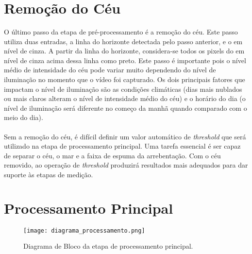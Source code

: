 \section{Remoção do Céu}
\paragraph{}O último passo da etapa de pré-processamento é a remoção do céu. Este passo utiliza duas entradas, a linha do horizonte detectada pelo passo anterior, e o \timestack em nível de cinza. A partir da linha do horizonte, considera-se todos os pixels do \timestack em nível de cinza acima dessa linha como preto. Este passo é importante pois o nível médio de intensidade do céu pode variar muito dependendo do nível de iluminação no momento que o vídeo foi capturado. Os dois principais fatores que impactam o nível de iluminação são as condições climáticas (dias mais nublados ou mais claros alteram o nível de intensidade médio do céu) e o horário do dia (o nível de iluminação será diferente no começo da manhã quando comparado com o meio do dia).
\paragraph{}Sem a remoção do céu, é difícil definir um valor automático de \textit{threshold} que será utilizado na etapa de processamento principal. Uma tarefa essencial é ser capaz de separar o céu, o mar e a faixa de espuma da arrebentação. Com o céu removido, ao operação de  \textit{threshold} produzirá resultados mais adequados para dar suporte às etapas de medição.
\section{Processamento Principal}
\begin{figure}[h]
\begin{center}
  \texttt{[image: diagrama\_processamento.png]}
  \caption[\small{Diagrama de Bloco da etapa de processamento principal.}]{\label{FigDiagramaProc} \small{Diagrama de Bloco da etapa de processamento principal.}}
\end{center}
\end{figure}
